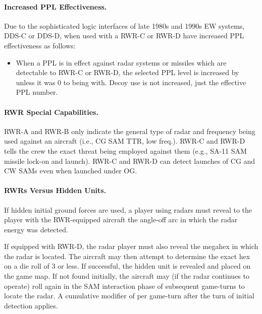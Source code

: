 \begin{advancedrules}
\paragraph{Increased PPL Effectiveness.} Due to the sophisticated logic interfaces of late 1980s and 1990s EW systems, DDS-C or DDS-D, when used with a RWR-C or RWR-D have increased PPL effectiveness as follows:

\begin{itemize}
    \item When a PPL is in effect against radar systems or missiles which are detectable to RWR-C or RWR-D, the selected PPL level is increased by  unless it was 0 to being with. Decoy use is not increased, just the effective PPL number.
\end{itemize}

\paragraph{RWR Special Capabilities.} RWR-A and RWR-B only indicate the general type of radar and frequency being used against an aircraft (i.e., CG SAM TTR, low freq.). RWR-C and RWR-D tells the crew the exact threat being employed against them (e.g., SA-11 SAM missile lock-on and launch). RWR-C and RWR-D can detect launches of CG and CW SAMs even when launched under OG.

\paragraph{RWRs Versus Hidden Units.} If hidden initial ground forces are used, a player using radars must reveal to the player with the RWR-equipped aircraft the angle-off arc in which the radar energy was detected.

If equipped with RWR-D, the radar player must also reveal the megahex in which the radar is located. The aircraft may then attempt to determine the exact hex on a die roll of 3 or less. If successful, the hidden unit is revealed and placed on the game map. If not found initially, the aircraft may (if the radar continues to operate) roll again in the SAM interaction phase of subsequent game-turns to locate the radar. A cumulative modifier of  per game-turn after the turn of initial detection applies.

\end{advancedrules}
